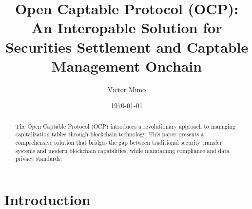 \documentclass[11pt,a4paper]{article}
\title{\textbf{Open Captable Protocol (OCP):\\An Interopable Solution for Securities Settlement and Captable Management Onchain}}
\author{Victor Mimo}
\date{\today}
\begin{document}
\maketitle

\begin{abstract}
The Open Captable Protocol (OCP) introduces a revolutionary approach to managing capitalization tables through blockchain technology. This paper presents a comprehensive solution that bridges the gap between traditional security transfer systems and modern blockchain capabilities, while maintaining compliance and data privacy standards.
\end{abstract}

\section{Introduction}
\end{document}
